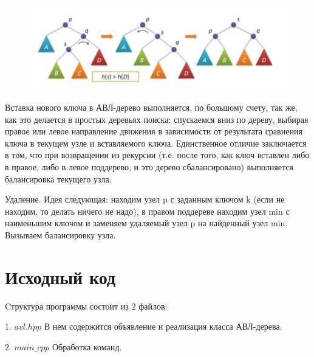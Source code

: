 \begin{figure}[!ht]
\begin{center}
\includegraphics[scale=0.5]{./images/3.jpg}\caption{}\label{figure1}
\end{center}
\end{figure}

Вставка нового ключа в АВЛ-дерево выполняется, по большому счету, так же, как это делается в простых деревьях поиска: спускаемся вниз по дереву, выбирая правое или левое направление движения в зависимости от результата сравнения ключа в текущем узле и вставляемого ключа.
Единственное отличие заключается в том, что при возвращении из рекурсии (т.е. после того, как ключ вставлен либо в правое, либо в левое поддерево, и это дерево сбалансировано)
выполняется балансировка текущего узла.

Удаление. Идея следующая: находим узел p с заданным ключом k (если не находим, то делать ничего не надо), в правом поддереве находим узел min с наименьшим ключом и заменяем удаляемый узел p на найденный узел min. Вызываем балансировку узла.

\pagebreak

\section{Исходный код}
Cтруктура программы состоит из 2 файлов:

1. $avl.hpp$ В нем содержится объявление и реализация класса АВЛ-дерева.

2. $main\_cpp$ Обработка команд.
 
